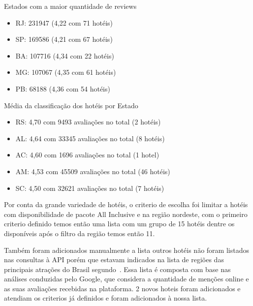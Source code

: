 Estados com a maior quantidade de reviews

\begin{itemize}
	\item RJ: 231947 (4,22 com 71 hotéis)
	\item SP: 169586 (4,21 com 67 hotéis)
	\item BA: 107716 (4,34 com 22 hotéis)
	\item MG: 107067 (4,35 com 61 hotéis)
	\item PB: 68188 (4,36 com 54 hotéis)
\end{itemize}


Média da classificação dos hotéis por Estado

\begin{itemize}
	\item RS: 4,70 com 9493 avaliações no total (2 hotéis)
	\item AL: 4,64 com 33345 avaliações no total (8 hotéis)
	\item AC: 4,60 com 1696 avaliações no total (1 hotel)
	\item AM: 4,53 com 45509 avaliações no total (46 hotéis)
	\item SC: 4,50 com 32621 avaliações no total (7 hotéis)
\end{itemize}


Por conta da grande variedade de hotéis, o criterio de escolha foi limitar a hotéis com disponibilidade de pacote All Inclusive e na região nordeste, com o primeiro criterio definido temos então uma lista com um grupo de 15 hotéis dentre os disponíveis após o filtro da região temos então 11.


Também foram adicionados manualmente a lista outros hotéis não foram listados nas consultas à API porém que estavam indicados na lista de regiões das principais atrações do Brasil segundo~\cite{googleFlights2022destinos}. Essa lista é composta com base nas análises conduzidas pelo Google, que considera a quantidade de menções online e as suas avaliações recebidas na plataforma. 2 novos hoteis foram adicionados e atendiam os criterios já definidos e foram adicionados à nossa lista.

